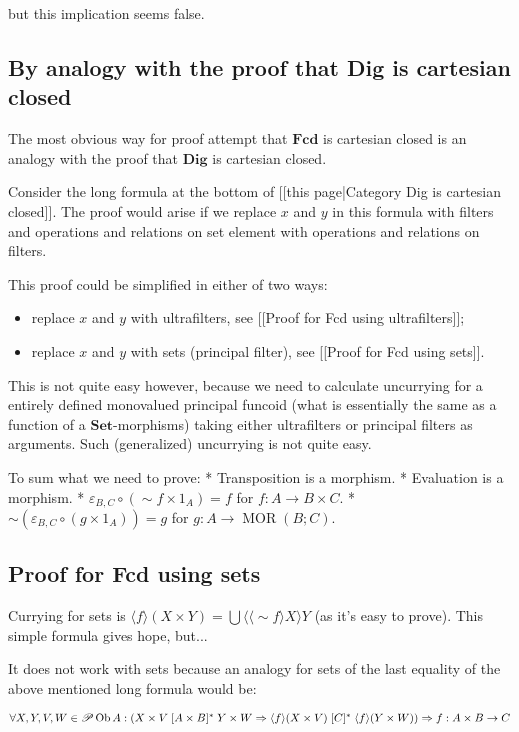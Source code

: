 but this implication seems false.

\subsection{By analogy with the proof that Dig is cartesian closed}

The most obvious way for proof attempt that $\mathbf{Fcd}$ is cartesian closed is an analogy with the proof that
$\mathbf{Dig}$ is cartesian closed.

Consider the long formula at the bottom of [[this page|Category Dig is cartesian closed]]. The proof would arise if we replace $x$ and $y$ in this formula with filters and operations and relations on set element with operations and relations on filters.

This proof could be simplified in either of two ways:
\begin{itemize}
\item replace $x$ and $y$ with ultrafilters, see [[Proof for Fcd using ultrafilters]];
\item replace $x$ and $y$ with sets (principal filter), see [[Proof for Fcd using sets]].
\end{itemize}

This is not quite easy however, because we need to calculate uncurrying for a entirely defined monovalued principal funcoid (what is essentially the same as a function of a $\mathbf{Set}$-morphisms) taking either ultrafilters or principal filters as arguments. Such (generalized) uncurrying is not quite easy.

To sum what we need to prove:
* Transposition is a morphism.
* Evaluation is a morphism.
* $\varepsilon_{B,C} \circ ( \sim f \times 1_A) = f$ for $f : A \rightarrow B \times C$.
* $\sim ( \varepsilon_{B,C} \circ ( g \times 1_A)) = g$ for $g : A \rightarrow \operatorname{MOR} ( B ; C)$.

\subsection{Proof for Fcd using sets}

Currying for sets is $\langle f \rangle ( X \times Y) = \bigcup \langle \langle \sim f \rangle X
\rangle Y$ (as it's easy to prove). This simple formula gives hope, but...

It does not work with sets because an analogy for sets of the last equality of the above mentioned long formula would be:

$\forall X, Y, V, W \in \mathscr{P} \operatorname{Ob} A : \left( X \times V \mathrel{[
A \times B]^{\ast}} Y \times W \Rightarrow \langle f \rangle ( X \times V)
\mathrel{[ C]^{\ast}} \langle f \rangle ( Y \times W) \right) \Rightarrow \\ f : A
\times B \rightarrow C$

